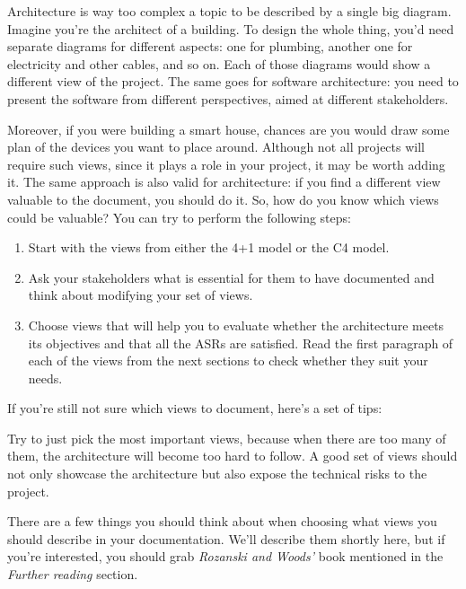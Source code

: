 
Architecture is way too complex a topic to be described by a single big diagram. Imagine you're the architect of a building. To design the whole thing, you'd need separate diagrams for different aspects: one for plumbing, another one for electricity and other cables, and so on. Each of those diagrams would show a different view of the project. The same goes for software architecture: you need to present the software from different perspectives, aimed at different stakeholders.

Moreover, if you were building a smart house, chances are you would draw some plan of the devices you want to place around. Although not all projects will require such views, since it plays a role in your project, it may be worth adding it. The same approach is also valid for architecture: if you find a different view valuable to the document, you should do it. So, how do you know which views could be valuable? You can try to perform the following steps:


\begin{enumerate}
\item
Start with the views from either the 4+1 model or the C4 model.

\item 
Ask your stakeholders what is essential for them to have documented and think about modifying your set of views.

\item
Choose views that will help you to evaluate whether the architecture meets its objectives and that all the ASRs are satisfied. Read the first paragraph of each of the views from the next sections to check whether they suit your needs.
\end{enumerate}

If you're still not sure which views to document, here's a set of tips:

\begin{tcolorbox}[colback=webgreen!5!white,colframe=webgreen!75!black, title=TIP]
\hspace*{0.7cm}Try to just pick the most important views, because when there are too many of them, the architecture will become too hard to follow. A good set of views should not only showcase the architecture but also expose the technical risks to the project.

\end{tcolorbox}

There are a few things you should think about when choosing what views you should describe in your documentation. We'll describe them shortly here, but if you're interested, you should grab \textit{Rozanski and Woods'} book mentioned in the \textit{Further reading} section.


